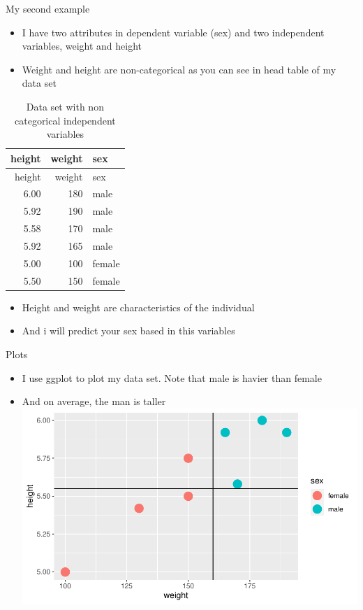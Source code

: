 \documentclass[
  10pt,
  ignorenonframetext,
]{beamer}
\providecommand{\tightlist}{%
  \setlength{\itemsep}{0pt}\setlength{\parskip}{0pt}}
\begin{document}
\begin{frame}{My second example}
\protect\hypertarget{my-second-example}{}

\begin{itemize}
\tightlist
\item
  I have two attributes in dependent variable (sex) and two independent
  variables, weight and height
\item
  Weight and height are non-categorical as you can see in head table of
  my data set
\end{itemize}

\begin{longtable}[]{@{}rrl@{}}
\caption{Data set with non categorical independent
variables}\tabularnewline
\toprule
height & weight & sex\tabularnewline
\midrule
\endfirsthead
\toprule
height & weight & sex\tabularnewline
\midrule
\endhead
6.00 & 180 & male\tabularnewline
5.92 & 190 & male\tabularnewline
5.58 & 170 & male\tabularnewline
5.92 & 165 & male\tabularnewline
5.00 & 100 & female\tabularnewline
5.50 & 150 & female\tabularnewline
\bottomrule
\end{longtable}

\begin{itemize}
\tightlist
\item
  Height and weight are characteristics of the individual
\item
  And i will predict your sex based in this variables
\end{itemize}

\end{frame}

\begin{frame}{Plots}
\protect\hypertarget{plots-1}{}

\begin{itemize}
\tightlist
\item
  I use ggplot to plot my data set. Note that male is havier than female
\item
  And on average, the man is taller
  \includegraphics{MJ_Ribeiro_files/figure-beamer/unnamed-chunk-13-1.pdf}
\end{itemize}

\end{frame}
\end{document}
